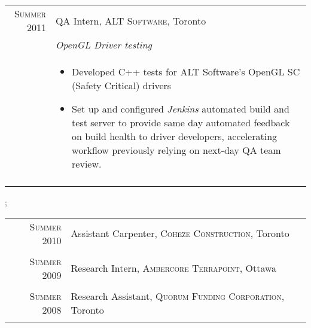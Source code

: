 \documentclass[a4paper,10pt]{article}
\begin{document}
\begin{longtable}{r|p{15cm}}
\textsc{Summer 2011} & QA Intern, \textsc{ALT Software}, Toronto \\
                                     &\emph{OpenGL Driver testing}\\
                                     &\footnotesize{
\begin{itemize}\vspace*{-\baselineskip}
  \item Developed C++ tests for ALT Software's OpenGL SC (Safety Critical) drivers
  \item Set up and configured \textit{Jenkins} automated build and test server to provide same day automated feedback on build health to driver developers, accelerating workflow previously relying on next-day QA team review.
\end{itemize}\vspace*{-\baselineskip}\vspace*{-\baselineskip}
} \\\multicolumn{2}{c}{} \\

\end{longtable}\vspace*{-\baselineskip}

\newpage

;

\hspace{-0.75cm}
\makebox[0pt][s]{
  \raisebox{-\totalheight}[0pt][0pt]{
``  \begin{tikzpicture}
	\draw[draw=white,fill=white, opacity=0.9] (0,0) rectangle ++(\paperwidth-2cm,\paperheight-4.5cm);
    \end{tikzpicture}
  }
}

\begin{longtable}{r|p{15cm}}

\textsc{Summer 2010} & Assistant Carpenter, \textsc{Coheze Construction}, Toronto \\\multicolumn{2}{c}{} \\

\textsc{Summer 2009} & Research Intern, \textsc{Ambercore Terrapoint}, Ottawa \\\multicolumn{2}{c}{} \\

\textsc{Summer 2008} & Research Assistant, \textsc{Quorum Funding Corporation}, Toronto \\\multicolumn{2}{c}{} \\

\end{longtable}\vspace*{-\baselineskip}
\end{document}
